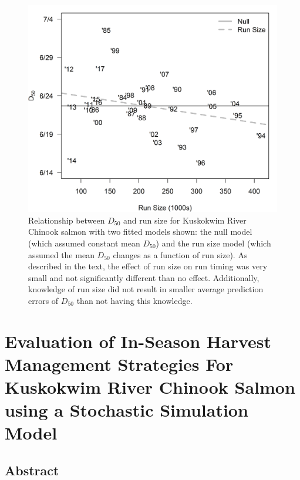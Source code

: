 \documentclass[12pt,]{book}
\theoremstyle{definition}
\theoremstyle{definition}
\theoremstyle{definition}
\theoremstyle{remark}
\begin{document}
\begin{figure}
  \centering
  \includegraphics{img/Ch2/rt-n.png}
  \caption{Relationship between $D_{50}$ and run size for Kuskokwim River Chinook salmon with two fitted models shown: the null model (which assumed constant mean $D_{50}$) and the run size model (which assumed the mean $D_{50}$ changes as a function of run size). As described in the text, the effect of run size on run timing was very small and not significantly different than no effect. Additionally, knowledge of run size did not result in smaller average prediction errors of $D_{50}$ than not having this knowledge.}
  \label{fig:rt-n}
\end{figure}

\chapter{Evaluation of In-Season Harvest Management Strategies For
Kuskokwim River Chinook Salmon using a Stochastic Simulation
Model}\label{ch3}

\section*{Abstract}\label{abstract-1}
\end{document}
